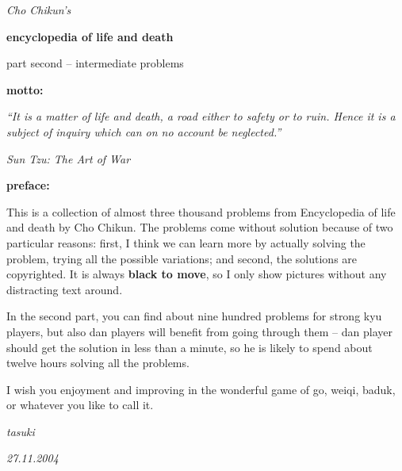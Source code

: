\documentclass[11pt]{book}
\begin{document}
\begin{titlepage}

    \vspace*{0.2\textheight}

    \begin{center}
        \textit{\large Cho Chikun's}
    \end{center}
    \begin{center}
        \textbf{\huge encyclopedia of life and death}
    \end{center}
    \begin{center}
        {\large part second -- intermediate problems}
    \end{center}

\end{titlepage}

\newpage %


\noindent\textbf{\Large motto:}

\medskip
\textit{\normalsize ``It is a matter of life and death, a road either to safety or to ruin. Hence it is a subject of inquiry which can on no account be neglected.''}

\medskip
\hfill {\it Sun Tzu: The Art of War}
\bigskip

\noindent\textbf{\Large preface:}

\medskip
{
\normalsize
This is a collection of almost three thousand problems from Encyclopedia of life and death by Cho Chikun. The problems come without solution because of two particular reasons: first, I think we can learn more by actually solving the problem, trying all the possible variations; and second, the solutions are copyrighted. It is always {\bf black to move}, so I only show pictures without any distracting text around.

In the second part, you can find about nine hundred problems for strong kyu players, but also dan players will benefit from going through them -- dan player should get the solution in less than a minute, so he is likely to spend about twelve hours solving all the problems.

I wish you enjoyment and improving in the wonderful game of go, weiqi, baduk, or whatever you like to call it.
}

\medskip
\hfill \textit{tasuki}

\hfill \textit{27.11.2004}

\newpage %


\begin{multicols}{2}
    
\end{multicols}
\end{document}
